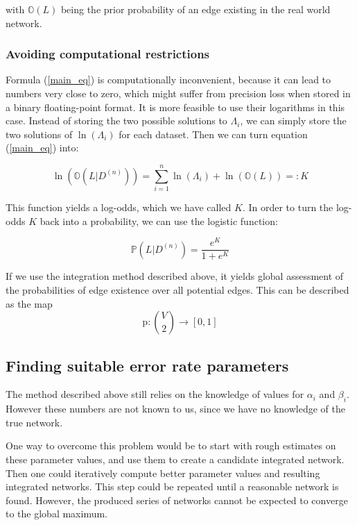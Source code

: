 \documentclass{scrartcl}
\newcommand{\prob}{\mathbb{P}}
\newcommand{\odds}{\mathbb{O}}
\newcommand{\p}{\text{p}}
\begin{document}
with $\odds(L)$ being the prior probability of an edge existing in the real world network. 




\subsubsection{Avoiding computational restrictions}

Formula (\ref{main_eq}) is computationally inconvenient, because it can lead to numbers very close to zero, which might suffer from precision loss when stored in a binary floating-point format. It is more feasible to use their logarithms in this case. Instead of storing the two possible solutions to $\Lambda_i$, we can simply store the two solutions of $\ln(\Lambda_i)$ for each dataset. Then we can turn equation (\ref{main_eq}) into:

$$\ln(\odds(L|D^{(n)})) = \sum_{i=1}^n \ln (\Lambda_i) + \ln(\odds(L)) =: K$$

This function yields a log-odds, which we have called $K$. In order to turn the log-odds $K$ back into a probability, we can use the logistic function:

$$\prob(L | D^{(n)}) = \frac{e^K}{1 + e^K}$$


If we use the integration method described above, it yields global assessment of the probabilities of edge existence over all potential edges. This can be described as the map
$$ \p: \binom{V}{2} \rightarrow [0,1] $$

\subsection{Finding suitable error rate parameters}

The method described above still relies on the knowledge of values for $\alpha_i$ and $\beta_i$. However these numbers are not known to us, since we have no knowledge of the true network.

One way to overcome this problem would be to start with rough estimates on these parameter values, and use them to create a candidate integrated network. Then one could iteratively compute better parameter values and resulting integrated networks. This step could be repeated until a reasonable network is found. However, the produced series of networks cannot be expected to converge to the global maximum.



\end{document}
